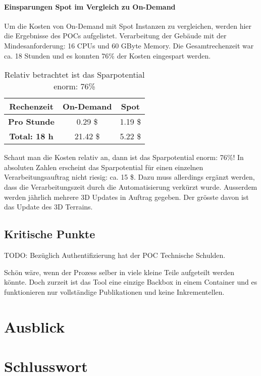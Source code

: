 \paragraph{Einsparungen Spot im Vergleich zu On-Demand}
Um die Kosten von On-Demand mit Spot Instanzen zu vergleichen, werden hier die Ergebnisse des POCs aufgelistet. Verarbeitung der Gebäude mit der Mindesanforderung: 16 CPUs und 60 GByte Memory. Die Gesamtrechenzeit war ca. 18 Stunden und es konnten 76\% der Kosten eingespart werden.

\begin{table}[!htbp]
\begin{center}
\begin{tabular}{| c | c | c |}
    \hline
	\textbf{Rechenzeit} & \textbf{On-Demand} & \textbf{Spot}\\
	\hline
	 \textbf{Pro Stunde} & 0.29 \$ & 1.19 \$\\
	\hline
	 \textbf{Total: 18 h} & 21.42 \$ & 5.22 \$\\
	\hline
\end{tabular}
\caption{\label{tab:price_difference}Relativ betrachtet ist das Sparpotential enorm: 76\%}
\end{center}
\end{table}

Schaut man die Kosten relativ an, dann ist das Sparpotential enorm: 76\%! In absoluten Zahlen erscheint das Sparpotential für einen einzelnen Verarbeitungsauftrag nicht riesig: ca. 15 \$. Dazu muss allerdings ergänzt werden, dass die Verarbeitungszeit durch die Automatisierung verkürzt wurde. Ausserdem werden jährlich mehrere 3D Updates in Auftrag gegeben. Der grösste davon ist das Update des 3D Terrains.

\subsection{Kritische Punkte}
TODO: 
Bezüglich Authentifizierung hat der POC Technische Schulden.

Schön wäre, wenn der Prozess selber in viele kleine Teile aufgeteilt werden könnte. Doch zurzeit ist das Tool eine einzige Backbox in einem Container und es funktionieren nur vollständige Publikationen und keine Inkrementellen. 


\section{Ausblick}

\section{Schlusswort}
